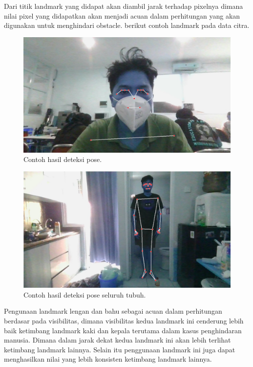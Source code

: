 Dari titik landmark yang didapat akan diambil jarak terhadap pixelnya dimana nilai pixel yang didapatkan akan menjadi acuan dalam perhitungan yang akan digunakan untuk menghindari obstacle. berikut contoh landmark pada data citra.

\begin{figure}[H]
  \centering
  \includegraphics[scale=0.35]{gambar/fotomediapipe.jpg}
  \caption{Contoh hasil deteksi pose.}
  \label{fig:confusion matrix model}
\end{figure}

\begin{figure}[H]
  \centering
  \includegraphics[scale=0.35]{gambar/fotomediapipe2.jpg}
  \caption{Contoh hasil deteksi pose seluruh tubuh.}
  \label{fig:confusion matrix model}
\end{figure}

Pengunaan landmark lengan dan bahu sebagai acuan dalam perhitungan berdasar pada visibilitas, dimana visibilitas kedua landmark ini cenderung lebih baik ketimbang landmark kaki dan kepala terutama dalam kasus penghindaran manusia. Dimana dalam jarak dekat kedua landmark ini akan lebih terlihat ketimbang landmark lainnya. Selain itu penggunaan landmark ini juga dapat menghasilkan nilai yang lebih konsisten ketimbang landmark lainnya.

